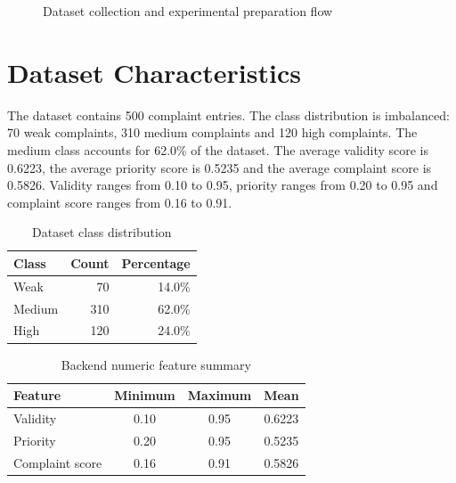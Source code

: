 \documentclass[12pt,a4paper,openany]{book}
\begin{document}
\begin{figure}[H]
\centering
{}
\caption{Dataset collection and experimental preparation flow}
\label{fig:data_flow}
\end{figure}

\section{Dataset Characteristics}
The dataset contains 500 complaint entries. The class distribution is imbalanced: 70 weak complaints, 310 medium complaints and 120 high complaints. The medium class accounts for 62.0\% of the dataset. The average validity score is 0.6223, the average priority score is 0.5235 and the average complaint score is 0.5826. Validity ranges from 0.10 to 0.95, priority ranges from 0.20 to 0.95 and complaint score ranges from 0.16 to 0.91.

\begin{table}[H]
\centering
\caption{Dataset class distribution}
\label{tab:class_distribution}
\begin{tabular}{lrr}
\toprule
\textbf{Class} & \textbf{Count} & \textbf{Percentage}\\
\midrule
Weak & 70 & 14.0\%\\
Medium & 310 & 62.0\%\\
High & 120 & 24.0\%\\
\bottomrule
\end{tabular}
\end{table}

\begin{table}[H]
\centering
\caption{Backend numeric feature summary}
\label{tab:numeric_summary}
\begin{tabular}{lccc}
\toprule
\textbf{Feature} & \textbf{Minimum} & \textbf{Maximum} & \textbf{Mean}\\
\midrule
Validity & 0.10 & 0.95 & 0.6223\\
Priority & 0.20 & 0.95 & 0.5235\\
Complaint score & 0.16 & 0.91 & 0.5826\\
\bottomrule
\end{tabular}
\end{table}
\end{document}
